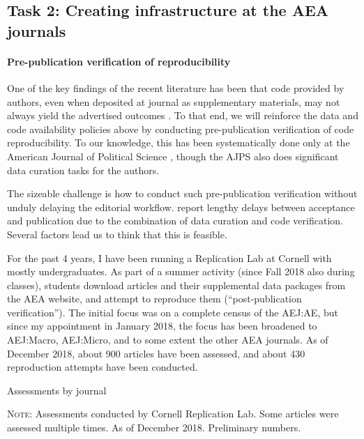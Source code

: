 \documentclass[AEJ]{AEA}
\begin{document}
\FloatBarrier
\subsection{Task 2: Creating infrastructure at the AEA journals}

\paragraph{Pre-publication verification of reproducibility} One of the key findings of the recent literature has been that code provided by authors, even when deposited at journal as supplementary materials, may not always yield the advertised outcomes \citep{Chang2015-dl,ChangAm.Econ.Rev.2017,Hoffler-LibMag.2017}. To that end, we will reinforce the data and code availability policies above by conducting pre-publication verification of code reproducibility. To our knowledge, this has been systematically done only at the American Journal of Political Science \citep{Christian2018}, though the AJPS also does significant data curation tasks for the authors.

The sizeable challenge is how to conduct such pre-publication verification without unduly delaying the editorial workflow. \cite{Christian2018} report lengthy delays between acceptance and publication due to the combination of data curation and code verification. Several factors lead us to think that this is feasible.

For the past 4 years, I have been running a Replication Lab at Cornell with mostly undergraduates. As part of a summer activity (since Fall 2018 also during classes), students download articles and their supplemental data packages from the AEA website, and attempt to reproduce them (``post-publication verification''). The initial focus was on a complete census of the AEJ:AE, but since my appointment in January 2018, the focus has been broadened to AEJ:Macro, AEJ:Micro, and to some extent the other AEA journals. As of December 2018, about 900 articles have been assessed, and about 430 reproduction attempts have been conducted.
\begin{table}
\caption{Assessments by journal\label{tab:assess_by_journal}} 
\tiny
{}

\begin{minipage}{\textwidth}
	\textsc{Note:} Assessments conducted by Cornell Replication Lab. Some articles were assessed multiple times. As of December 2018. Preliminary numbers. 
\end{minipage}
\end{table}
\end{document}
